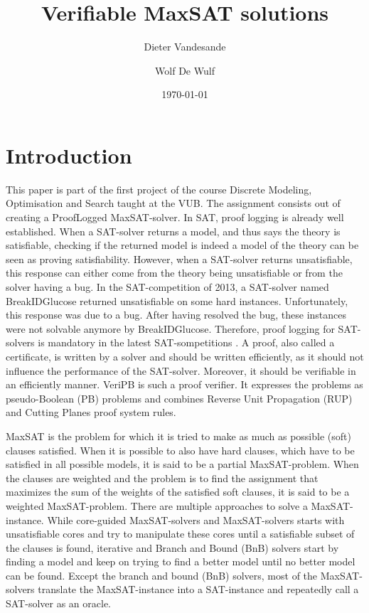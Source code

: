 \documentclass{article}
\title{Verifiable MaxSAT solutions}
\author{Dieter Vandesande \and Wolf De Wulf}
\date{\today}
\theoremstyle{mytheoremstyle}
\theoremstyle{mytheoremstyle}
\theoremstyle{myproblemstyle}
\begin{document}
\maketitle

\section{Introduction}
\label{sec:intro}
This paper is part of the first project of the course Discrete Modeling, Optimisation and Search taught at the VUB. The assignment consists out of creating a ProofLogged MaxSAT-solver. In SAT, proof logging is already well established. When a SAT-solver returns a model, and thus says the theory is satisfiable, checking if the returned model is indeed a model of the theory can be seen as proving satisfiability. However, when a SAT-solver returns unsatisfiable, this response can either come from the theory being unsatisfiable or from the solver having a bug. In the SAT-competition of 2013, a SAT-solver named BreakIDGlucose returned unsatisfiable on some hard instances. Unfortunately, this response was due to a bug. After having resolved the bug, these instances were not solvable anymore by BreakIDGlucose. Therefore, proof logging for SAT-solvers is mandatory in the latest SAT-sompetitions \autocite{satcomp2018}. A proof, also called a certificate, is written by a solver and should be written efficiently, as it should not influence the performance of the SAT-solver. Moreover, it should be verifiable in an efficiently manner. VeriPB \autocite{veripb} is such a proof verifier. It expresses the problems as pseudo-Boolean (PB) problems and combines Reverse Unit Propagation (RUP) and Cutting Planes proof system rules. \newline \par
MaxSAT \autocite{li2009maxsat, biere2009handbook} is the problem for which it is tried to make as much as possible (soft) clauses satisfied. When it is possible to also have hard clauses, which have to be satisfied in all possible models, it is said to be a partial MaxSAT-problem. When the clauses are weighted and the problem is to find the assignment that maximizes the sum of the weights of the satisfied soft clauses, it is said to be a weighted MaxSAT-problem. There are multiple approaches to solve a MaxSAT-instance.  While core-guided MaxSAT-solvers and MaxSAT-solvers starts with unsatisfiable cores and try to manipulate these cores until a satisfiable subset of the clauses is found, iterative \autocite{qmaxsat} and Branch and Bound (BnB) \autocite{maxcdcl, ahmaxsat} solvers start by finding a model and keep on trying to find a better model until no better model can be found. Except the branch and bound (BnB) solvers, most of the MaxSAT-solvers translate the MaxSAT-instance into a SAT-instance and repeatedly call a SAT-solver as an oracle. \newline \par
 
\end{document}
